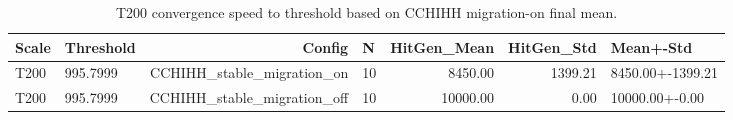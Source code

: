 \begin{table}[htbp]
\centering
\caption{T200 convergence speed to threshold based on CCHIHH migration-on final mean.}
\label{tab:t200_convergence_speed}
\begin{tabular}{llrlrrl}
\toprule
Scale & Threshold & Config & N & HitGen_Mean & HitGen_Std & Mean+-Std \\
\midrule
T200 & 995.7999 & CCHIHH_stable_migration_on & 10 & 8450.00 & 1399.21 & 8450.00+-1399.21 \\
T200 & 995.7999 & CCHIHH_stable_migration_off & 10 & 10000.00 & 0.00 & 10000.00+-0.00 \\
\bottomrule
\end{tabular}
\end{table}
